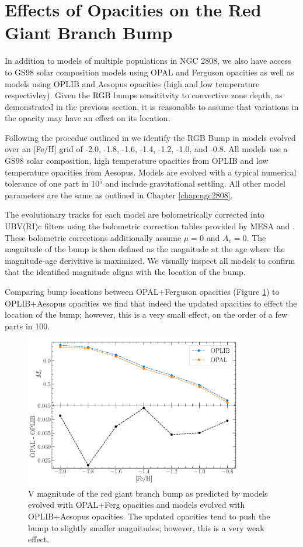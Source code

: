 \section{Effects of Opacities on the Red Giant Branch Bump}
In addition to models of multiple populations in NGC 2808, we also have access
to GS98 solar composition models using OPAL and Ferguson opacities as well as
models using OPLIB and Aesopus opacities (high and low temperature
respectivley). Given the RGB bumps sensititvity to convective zone depth, as
demonstrated in the previous section, it is reasonable to assume that
variations in the opacity may have an effect on its location. 

Following the procedue outlined in \citep{Joyce2016} we identify the RGB Bump
in models evolved over an [Fe/H] grid of -2.0, -1.8, -1.6, -1.4, -1.2, -1.0,
and -0.8. All models use a GS98 solar composition, high temperature opacities
from OPLIB and low temperature opacities from Aesopus. Models are evolved with
a typical numerical tolerance of one part in 10$^{5}$ and include gravitational
settling. All other model parameters are the same as outlined in Chapter \ref{chap:ngc2808}. 

The evolutionary tracks for each model are bolometrically corrected into
UBV(RI)c filters using the bolometric correction tables provided by MESA
\citep{Choi2016} and \fidanka. These bolometric corrections additionally assume $\mu =
0$ and $A_{v} = 0$. The magnitude of the bump is then defined as the magnitude
at the age where the magnitude-age derivitive is maximized. We visually inspect
all models to confirm that the identified magnitude aligns with the location of
the bump.

Comparing bump locations between OPAL+Ferguson opacities (Figure
\ref{fig:OPALvsOPLIBRGBB}) to OPLIB+Aesopus opacities we find that indeed the
updated opacities to effect the location of the bump; however, this is a very
small effect, on the order of a few parts in 100.

\begin{figure}
  \centering
  \includegraphics[width=0.85\textwidth]{figures/rgbb/OPALvsOPLIBComparison.pdf}
  \caption{V magnitude of the red giant branch bump as predicted by models
  evolved with OPAL+Ferg opacities and models evolved with OPLIB+Aesopus
  opacities. The updated opacities tend to push the bump to slightly smaller
  magnitudes; however, this is a very weak effect.}
  \label{fig:OPALvsOPLIBRGBB}
\end{figure}
